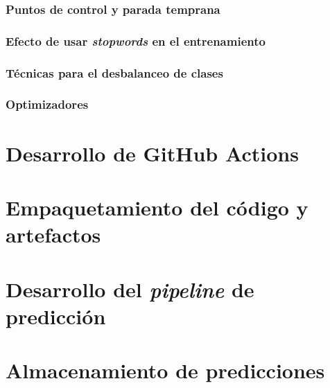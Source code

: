 \subsubsection{Puntos de control y parada temprana}



\subsubsection{Efecto de usar \textit{stopwords} en el entrenamiento}

\subsubsection{Técnicas para el desbalanceo de clases}

\subsubsection{Optimizadores}


\section{Desarrollo de GitHub Actions}



\section{Empaquetamiento del código y artefactos}



\section{Desarrollo del \textit{pipeline} de predicción}



\section{Almacenamiento de predicciones}

